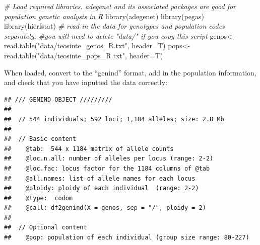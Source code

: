 \documentclass[
]{book}
\newenvironment{Shaded}{\begin{snugshade}}{\end{snugshade}}
\newcommand{\AttributeTok}[1]{\textcolor[rgb]{0.77,0.63,0.00}{#1}}
\newcommand{\CommentTok}[1]{\textcolor[rgb]{0.56,0.35,0.01}{\textit{#1}}}
\newcommand{\DecValTok}[1]{\textcolor[rgb]{0.00,0.00,0.81}{#1}}
\newcommand{\FunctionTok}[1]{\textcolor[rgb]{0.00,0.00,0.00}{#1}}
\newcommand{\NormalTok}[1]{#1}
\newcommand{\OtherTok}[1]{\textcolor[rgb]{0.56,0.35,0.01}{#1}}
\newcommand{\SpecialCharTok}[1]{\textcolor[rgb]{0.00,0.00,0.00}{#1}}
\newcommand{\StringTok}[1]{\textcolor[rgb]{0.31,0.60,0.02}{#1}}
\begin{document}
\begin{Shaded}
\begin{Highlighting}[]
\CommentTok{\# Load required libraries. adegenet and its associated packages are good for population genetic analysis in R}
\FunctionTok{library}\NormalTok{(adegenet)}
\FunctionTok{library}\NormalTok{(pegas)}
\FunctionTok{library}\NormalTok{(hierfstat)}
\CommentTok{\# read in the data for genotypes and population codes separately.}
\CommentTok{\#you will need to delete "data/" if you copy this script}
\NormalTok{genos}\OtherTok{\textless{}{-}}\FunctionTok{read.table}\NormalTok{(}\StringTok{"data/teosinte\_genos\_R.txt"}\NormalTok{, }\AttributeTok{header=}\NormalTok{T)}
\NormalTok{pops}\OtherTok{\textless{}{-}}\FunctionTok{read.table}\NormalTok{(}\StringTok{"data/teosinte\_pops\_R.txt"}\NormalTok{, }\AttributeTok{header=}\NormalTok{T)}
\end{Highlighting}
\end{Shaded}

When loaded, convert to the ``genind'' format, add in the population information, and check that you have inputted the data correctly:

\begin{Shaded}
\end{Shaded}

\begin{verbatim}
## /// GENIND OBJECT /////////
## 
##  // 544 individuals; 592 loci; 1,184 alleles; size: 2.8 Mb
## 
##  // Basic content
##    @tab:  544 x 1184 matrix of allele counts
##    @loc.n.all: number of alleles per locus (range: 2-2)
##    @loc.fac: locus factor for the 1184 columns of @tab
##    @all.names: list of allele names for each locus
##    @ploidy: ploidy of each individual  (range: 2-2)
##    @type:  codom
##    @call: df2genind(X = genos, sep = "/", ploidy = 2)
## 
##  // Optional content
##    @pop: population of each individual (group size range: 80-227)
\end{verbatim}
\end{document}
